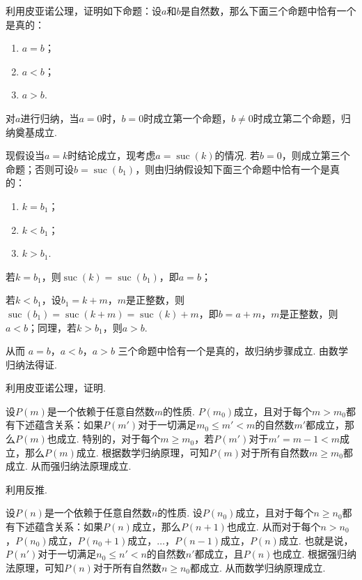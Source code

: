 \begin{exercise}
\begin{exgroup}
        \item 利用皮亚诺公理，证明如下命题：设$a$和$b$是自然数，那么下面三个命题中恰有一个是真的：
        \begin{enumerate}
            \item $a=b$；

            \item $a<b$；

            \item $a>b$.
        \end{enumerate}
        \begin{answer}
            对$a$进行归纳，当$a=0$时，$b=0$时成立第一个命题，$b\neq 0$时成立第二个命题，归纳奠基成立.

            现假设当$a=k$时结论成立，现考虑$a=\operatorname{suc}(k)$的情况. 若$b=0$，则成立第三个命题；否则可设$b=\operatorname{suc}(b_1)$，则由归纳假设知下面三个命题中恰有一个是真的：
            \begin{enumerate}
                \item $k=b_1$；

                \item $k<b_1$；

                \item $k>b_1$.
            \end{enumerate}
            若$k=b_1$，则$\operatorname{suc}(k)=\operatorname{suc}(b_1)$，即$a=b$；

            若$k<b_1$，设$b_1=k+m$，$m$是正整数，则$\operatorname{suc}(b_1)=\operatorname{suc}(k+m)=\operatorname{suc}(k)+m$，即$b=a+m$，$m$是正整数，则$a<b$；同理，若$k>b_1$，则$a>b$.

            从而 $a=b$，$a<b$，$a>b$ 三个命题中恰有一个是真的，故归纳步骤成立. 由数学归纳法得证.
        \end{answer}

        \item 利用皮亚诺公理，证明.
        \begin{answer}
            设$P(m)$是一个依赖于任意自然数$m$的性质. $P(m_0)$成立，且对于每个$m > m_0$都有下述蕴含关系：如果$P(m')$对于一切满足$m_0\leqslant m'<m$的自然数$m'$都成立，那么$P(m)$也成立. 特别的，对于每个$m \geqslant m_0$，若$P(m')$对于$m'=m-1<m$成立，那么$P(m)$成立. 根据数学归纳原理，可知$P(m)$对于所有自然数$m\geqslant m_0$都成立. 从而强归纳法原理成立.
        \end{answer}

        \item 利用反推.
        \begin{answer}
            设$P(n)$是一个依赖于任意自然数$n$的性质. 设$P(n_0)$成立，且对于每个$n \geqslant n_0$都有下述蕴含关系：如果$P(n)$成立，那么$P(n+1)$也成立. 从而对于每个$n > n_0$，$P(n_0)$成立，$P(n_0+1)$成立，$\ldots$，$P(n-1)$成立，$P(n)$成立. 也就是说，$P(n')$对于一切满足$n_0\leqslant n'<n$的自然数$n'$都成立，且$P(n)$也成立. 根据强归纳法原理，可知$P(n)$对于所有自然数$n\geqslant n_0$都成立. 从而数学归纳原理成立.
        \end{answer}
    \end{exgroup}
\end{exercise}
